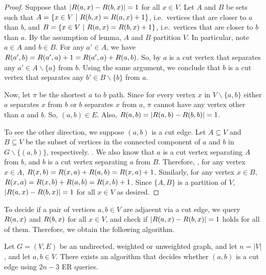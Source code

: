 \begin{proof}
    Suppose that $|R(a,x) - R(b,x)| = 1$ for all $x \in V$.
    Let $A$ and $B$ be sets such that $A = \{ x \in V \ | \ \res(b,x) = \res(a,x) + 1\}$, i.e.~vertices that are closer to $a$ than $b$, and $B = \{ x \in V \ | \ R(a,x) = R(b,x) + 1 \}$, i.e.~vertices that are closer to $b$ than $a$.  By the assumption of lemma, $A$ and $B$ partition $V$.  In particular, note $a\in A$ and $b\in B$.
    For any $a' \in A$, we have $R(a',b)=R(a',a)+1=R(a',a)+R(a,b)$. 
    So, by  $a$ is a cut vertex that separates any $a'\in A\backslash\{a\}$ from $b$.
    Using the same argument, we conclude that $b$ is a cut vertex that separates any $b' \in B\backslash\{b\}$ from $a$.
    
    Now, let $\pi$ be the shortest $a$ to $b$ path.  Since for every vertex $x$ in $V\backslash\{a,b\}$ either $a$ separates $x$ from $b$ or $b$ separates $x$ from $a$, $\pi$ cannot have any vertex other than $a$ and $b$.  So, $(a,b)\in E$.  Also, $R(a,b) = |R(a,b) - R(b,b)| = 1$. 

    To see the other direction, we suppose $(a,b)$ is a cut edge.  Let $A\subseteq V$ and $B\subseteq V$ be the subset of vertices in the connected component of $a$ and $b$ in $G\backslash\{(a,b)\}$, respectively.
    .  We also know that $a$ is a cut vertex separating $A$ from $b$, and $b$ is a cut vertex separating $a$ from $B$.  Therefore, , for any vertex $x\in A$, $R(x,b) = R(x,a) + R(a,b) = R(x,a) + 1$.
    Similarly, for any vertex $x\in B$, $R(x,a) = R(x,b) + R(a,b) = R(x,b) + 1$.  Since $\{A, B\}$ is a partition of $V$, $|R(a,x) - R(b,x)| = 1$ for all $x\in V$ as desired.
\end{proof}



To decide if a pair of vertices $a,b\in V$ are adjacent via a cut edge, we query $R(a,x)$ and $R(b,x)$ for all $x\in V$, and check if $|R(a,x) - R(b,x)| = 1$ holds for all of them.  Therefore, we obtain the following algorithm.

\begin{theorem}
    \label{thm:cut-edge-verification}
    Let $G=(V,E)$ be an undirected, weighted or unweighted graph, and let $n=|V|$, and let $a,b\in V$.
    There exists an algorithm that decides whether $(a,b)$ is a cut edge using $2n - 3$ ER queries.
\end{theorem}



